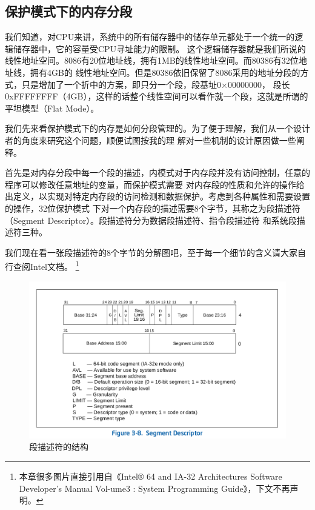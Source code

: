 \subsection{保护模式下的内存分段}

\par 我们知道，对CPU来讲，系统中的所有储存器中的储存单元都处于一个统一的逻辑储存器中，它的容量受CPU寻址能力的限制。\allowbreak
这个逻辑储存器就是我们所说的线性地址空间。8086有20位地址线，拥有1MB的线性地址空间。而80386有32位地址线，拥有4GB的\allowbreak
线性地址空间。但是80386依旧保留了8086采用的地址分段的方式，只是增加了一个折中的方案，即只分一个段，段基址0×00000000，\allowbreak
段长0xFFFFFFFF（4GB），这样的话整个线性空间可以看作就一个段，这就是所谓的平坦模型（Flat Mode）。

\par  我们先来看保护模式下的内存是如何分段管理的。为了便于理解，我们从一个设计者的角度来研究这个问题，顺便试图按我的理\allowbreak
解对一些机制的设计原因做一些阐释。

\par 首先是对内存分段中每一个段的描述，内模式对于内存段并没有访问控制，任意的程序可以修改任意地址的变量，而保护模式需要\allowbreak
对内存段的性质和允许的操作给出定义，以实现对特定内存段的访问检测和数据保护。考虑到各种属性和需要设置的操作，32位保护模式\allowbreak
下对一个内存段的描述需要8个字节，其称之为段描述符（Segment Descriptor）。段描述符分为数据段描述符、指令段描述符\allowbreak
和系统段描述符三种。

\par 我们现在看一张段描述符的8个字节的分解图吧，至于每一个细节的含义请大家自行查阅Intel文档。\allowbreak
\footnote{本章很多图片直接引用自《Intel® 64 and IA-32 Architectures Software Developer’s Manual Vol-ume3 :
System Programming Guide》，下文不再声明。}

\begin{figure}[H]
      \centering
      \includegraphics[scale=0.45]{picture/chapt6/segment_descriptor.png}
      \caption{段描述符的结构}
\end{figure}

